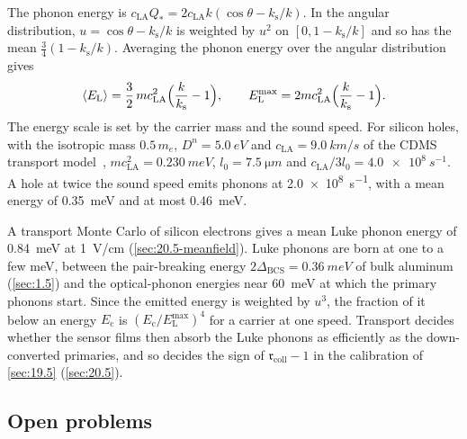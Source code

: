 The phonon energy is $c_{\mathrm{LA}}Q_* = 2c_{\mathrm{LA}}k(\cos\theta - k_{\mathrm{s}}/k)$. In the angular distribution, $u = \cos\theta - k_{\mathrm{s}}/k$ is weighted by $u^2$ on $[0, 1 - k_{\mathrm{s}}/k]$ and so has the mean $\frac34(1 - k_{\mathrm{s}}/k)$. Averaging the phonon energy over the angular distribution gives
\begin{equation}
  \langle E_{\mathrm{L}}\rangle = \frac32\,mc_{\mathrm{LA}}^2\Bigl(\frac{k}{k_{\mathrm{s}}} - 1\Bigr), \qquad E_{\mathrm{L}}^{\max} = 2mc_{\mathrm{LA}}^2\Bigl(\frac{k}{k_{\mathrm{s}}} - 1\Bigr) .
  \label{eq:20.1-Eluke}
\end{equation}
The energy scale is set by the carrier mass and the sound speed. For silicon holes, with the isotropic mass $0.5\,m_e$, $D^n = \SI{5.0}{eV}$ and $c_{\mathrm{LA}} = \SI{9.0}{km/s}$ of the CDMS transport model~\cite[Table~II]{leman2012invited}, $mc_{\mathrm{LA}}^2 = \SI{0.230}{meV}$, $l_0 = \SI{7.5}{\micro m}$ and $c_{\mathrm{LA}}/3l_0 = \SI{4.0e8}{s^{-1}}$. A hole at twice the sound speed emits phonons at \SI{2.0e8}{s^{-1}}, with a mean energy of \SI{0.35}{meV} and at most \SI{0.46}{meV}.

A transport Monte Carlo of silicon electrons gives a mean Luke phonon energy of \SI{0.84}{meV} at \SI{1}{V/cm} (\cref{sec:20.5-meanfield}). Luke phonons are born at one to a few meV, between the pair-breaking energy $2\Delta_{\mathrm{BCS}} = \SI{0.36}{meV}$ of bulk aluminum (\cref{sec:1.5}) and the optical-phonon energies near \SI{60}{meV} at which the primary phonons start. Since the emitted energy is weighted by $u^3$, the fraction of it below an energy $E_{\mathrm{c}}$ is $(E_{\mathrm{c}}/E_{\mathrm{L}}^{\max})^4$ for a carrier at one speed. Transport decides whether the sensor films then absorb the Luke phonons as efficiently as the down-converted primaries, and so decides the sign of $\mathfrak{r}_{\mathrm{coll}} - 1$ in the calibration of \cref{sec:19.5} (\cref{sec:20.5}).

\subsection{Open problems}\label{sec:20.1-open}

